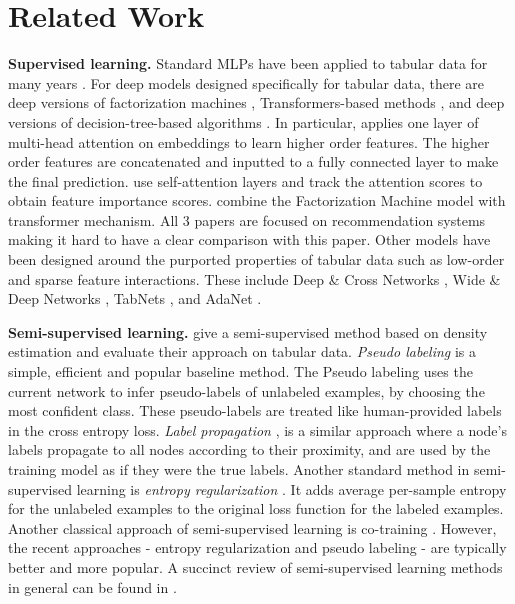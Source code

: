 \section{Related Work}
\textbf{Supervised learning.} Standard MLPs have been applied to tabular data for many years \citep{taxipaper}.
For deep models designed specifically for tabular data, %
there are deep versions of factorization machines \citep{guo_deepfm_2018,xiao_attentional_2017}, Transformers-based methods  \citep{song_autoint_2019,li_interpretable_2020,sun_deepenfm_2019}, and deep versions of decision-tree-based algorithms \citep{ke2019tabnn, yang2018deep}. In particular, \citep{song_autoint_2019} applies one layer of multi-head attention on embeddings to learn higher order features. The higher order features are concatenated and inputted to a fully connected layer to make the final prediction. \citep{li_interpretable_2020} use self-attention layers and track the attention scores to obtain feature importance scores. \citep{sun_deepenfm_2019} combine the Factorization Machine model with transformer mechanism. All 3 papers are focused on recommendation systems making it hard to have a clear comparison with this paper.
Other models have been designed around the purported properties of tabular data such as low-order and sparse feature interactions. These include Deep \& Cross Networks \citep{Wang2017DeepC},
Wide \& Deep Networks \citep{cheng2016wide}, TabNets \citep{arik2019tabnet}, and AdaNet \citep{cortes2016adanet}. %

\textbf{Semi-supervised learning.} \cite{izmailov_semi-supervised_2019} give a semi-supervised method based on density estimation and evaluate their approach on tabular data. %
{\em Pseudo labeling} \citep{lee2013pseudo} is a simple, efficient and popular baseline method. 
The Pseudo labeling uses the current
network to infer pseudo-labels of unlabeled examples, by choosing the most confident class. These pseudo-labels are treated like human-provided labels in the cross entropy loss. 
{\em Label propagation}
\citep{zhur2002learning},
\citep{iscen2019label}
is a similar approach where a node’s labels propagate to all nodes according to their proximity,
and are used by the training model as if they were the true labels. Another standard method in semi-supervised learning is {\em entropy regularization}
\citep{grandvalet2005semi, sajjadi2016regularization}. It adds average per-sample entropy for the unlabeled examples to the original loss function for the labeled
examples. Another classical approach of semi-supervised learning is co-training \citep{nigam2000analyzing}. However, the recent approaches - entropy regularization and pseudo labeling - are typically better and more popular. A succinct review of semi-supervised learning methods in general can be found in \citep{oliver_realistic_2019, chappelle2010semi}.

